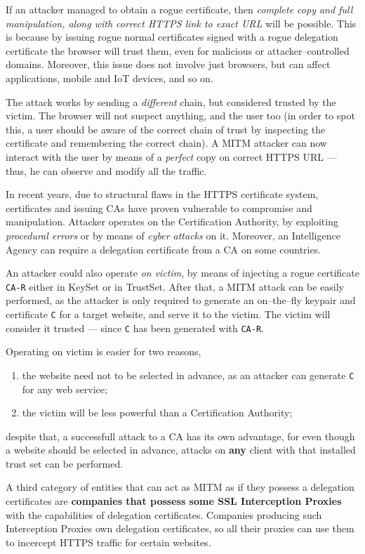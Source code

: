 \documentclass[10pt]{extreport}
\begin{document}
If an attacker managed to obtain a rogue certificate, then \emph{complete copy
and full manipulation, along with correct HTTPS link to exact URL} will be
possible. This is because by issuing rogue normal certificates signed with a
rogue delegation certificate the browser will trust them, even for malicious or
attacker\---controlled domains. Moreover, this issue does not involve just
browsers, but can affect applications, mobile and IoT devices, and so on.

The attack works by sending a \emph{different} chain, but considered trusted by
the victim. The browser will not suspect anything, and the user too (in order
to spot this, a user should be aware of the correct chain of trust by
inspecting the certificate and remembering the correct chain). A MITM attacker
can now interact with the user by means of a \emph{perfect} copy on correct
HTTPS URL --- thus, he can observe and modify all the traffic.

In recent years, due to structural flaws in the HTTPS certificate system,
certificates and issuing CAs have proven vulnerable to compromise and
manipulation. Attacker operates on the Certification Authority, by exploiting
\emph{procedural errors} or by means of \emph{cyber attacks} on it. Moreover,
an Intelligence Agency can require a delegation certificate from a CA on some
countries.

An attacker could also operate \emph{on victim}, by means of injecting a rogue
certificate \texttt{CA-R} either in KeySet or in TrustSet. After that, a MITM
attack can be easily performed, as the attacker is only required to generate an
on--the--fly keypair and certificate \texttt{C} for a target website, and serve
it to the victim. The victim will consider it trusted --- since \texttt{C} has
been generated with \texttt{CA-R}.

Operating on victim is easier for two reasons,
\begin{enumerate}
    \item the website need not to be selected in advance, as an attacker can
        generate \texttt{C} for any web service;
    \item the victim will be less powerful than a Certification Authority;
\end{enumerate}
despite that, a successfull attack to a CA has its own advantage, for even
though a website should be selected in advance, attacks on \textbf{any} client
with that installed trust set can be performed.

A third category of entities that can act as MITM as if they possess a
delegation certificates are \textbf{companies that possess some SSL
Interception Proxies} with the capabilities of delegation certificates.
Companies producing such Interception Proxies own delegation certificates, so
all their proxies can use them to incercept HTTPS traffic for certain websites.
\end{document}
